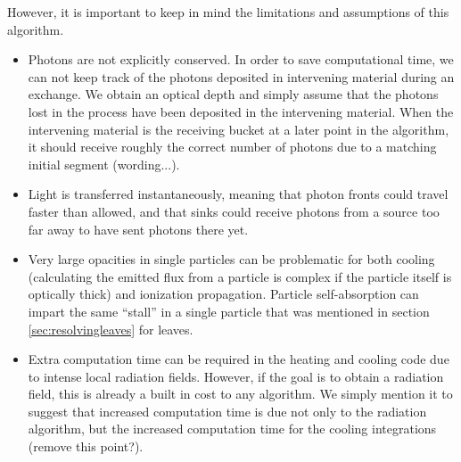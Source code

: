 However, it is important to keep in mind the limitations and assumptions of this algorithm.
\begin{itemize}
\item Photons are not explicitly conserved. In order to save computational time, we can not keep track of the photons deposited in intervening material during an exchange. We obtain an optical depth and simply assume that the photons lost in the process have been deposited in the intervening material. When the intervening material is the receiving bucket at a later point in the algorithm, it should receive roughly the correct number of photons due to a matching initial segment (wording...).
\item Light is transferred instantaneously, meaning that photon fronts could travel faster than allowed, and that sinks could receive photons from a source too far away to have sent photons there yet.
\item Very large opacities in single particles can be problematic for both cooling (calculating the emitted flux from a particle is complex if the particle itself is optically thick) and ionization propagation. Particle self-absorption can impart the same ``stall'' in a single particle that was mentioned in section \ref{sec:resolvingleaves} for leaves.
\item Extra computation time can be required in the heating and cooling code due to intense local radiation fields. However, if the goal is to obtain a radiation field, this is already a built in cost to any algorithm. We simply mention it to suggest that increased computation time is due not only to the radiation algorithm, but the increased computation time for the cooling integrations (remove this point?). 
\end{itemize}

